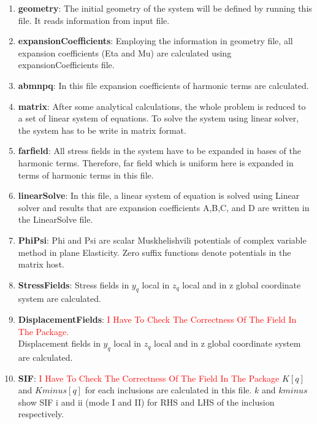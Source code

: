 \documentclass[12pt]{article}
\numberwithin{equation}{subsection}
\begin{document}
\begin{enumerate}
\item \textbf{geometry}: 
The initial geometry of the system will be defined by running this file. It reads information from input file.

\item \textbf{expansionCoefficients}: 
Employing the information in geometry file, all expansion coefficients (Eta and Mu) are calculated using expansionCoefficients file. 

\item \textbf{abmnpq}: 
In this file expansion coefficients of harmonic terms are calculated. 


\item \textbf{matrix}: 
After some analytical calculations, the whole problem is reduced to a set of linear system of equations. To solve the system using linear solver, the system has to be write in matrix format.

\item \textbf{farfield}:
All stress fields in the system have to be expanded in bases of the harmonic terms. Therefore, far field which is uniform here is expanded in terms of harmonic terms in this file. 

\item \textbf{linearSolve}: 
In this file, a linear system of equation is solved using Linear solver and results that are expansion coefficients A,B,C, and D are written in the LinearSolve file. 

\item \textbf{PhiPsi}: 
Phi and Psi are scalar Muskhelishvili potentials of complex variable method in plane Elasticity. Zero suffix functions denote potentials in the matrix host. 

\item \textbf{StressFields}: 
Stress fields in $y_{q}$ local in $z_{q}$ local and in z global coordinate system are calculated. 

\item \textbf{DisplacementFields}: 
\textcolor{red}{I Have To Check The Correctness Of The Field In The Package. }\\
Displacement fields in $y_{q}$ local in $z_{q}$ local and in z global coordinate system are calculated. 

\item \textbf{SIF}: 
\textcolor{red}{I Have To Check The Correctness Of The Field In The Package} $K[q]$ and $Kminus[q]$ for each inclusions are calculated in this file. $k$ and  $kminus$ show SIF i and ii (mode I and II) for RHS and LHS of the inclusion respectively.


\end{enumerate}
\end{document}
